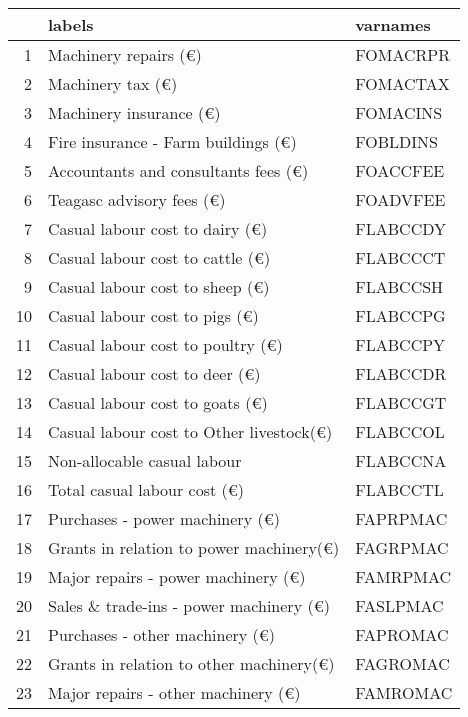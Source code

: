 \documentclass{article}\usepackage{graphicx, color}
\begin{document}
\begin{flushleft}
\newpage
\begin{table}[ht]
\begin{center}
\begin{tabular}{rll}
  \hline
 & labels & varnames \\ 
  \hline
1 & Machinery repairs                 (€) & FOMACRPR \\ 
  2 & Machinery tax                     (€) & FOMACTAX \\ 
  3 & Machinery insurance               (€) & FOMACINS \\ 
  4 & Fire insurance - Farm buildings   (€) & FOBLDINS \\ 
  5 & Accountants and consultants fees  (€) & FOACCFEE \\ 
  6 & Teagasc advisory fees             (€) & FOADVFEE \\ 
  7 & Casual labour cost to dairy       (€) & FLABCCDY \\ 
  8 & Casual labour cost to cattle      (€) & FLABCCCT \\ 
  9 & Casual labour cost to sheep       (€) & FLABCCSH \\ 
  10 & Casual labour cost to pigs        (€) & FLABCCPG \\ 
  11 & Casual labour cost to poultry     (€) & FLABCCPY \\ 
  12 & Casual labour cost to deer        (€) & FLABCCDR \\ 
  13 & Casual labour cost to goats       (€) & FLABCCGT \\ 
  14 & Casual labour cost to Other livestock(€) & FLABCCOL \\ 
  15 & Non-allocable casual labour & FLABCCNA \\ 
  16 & Total casual labour cost          (€) & FLABCCTL \\ 
  17 & Purchases - power machinery        (€) & FAPRPMAC \\ 
  18 & Grants in relation to power machinery(€) & FAGRPMAC \\ 
  19 & Major repairs - power machinery    (€) & FAMRPMAC \\ 
  20 & Sales \& trade-ins - power machinery (€) & FASLPMAC \\ 
  21 & Purchases - other machinery        (€) & FAPROMAC \\ 
  22 & Grants in relation to other machinery(€) & FAGROMAC \\ 
  23 & Major repairs - other machinery    (€) & FAMROMAC \\ 

\end{tabular}
\end{center}
\end{table}
\end{flushleft}
\end{document}
